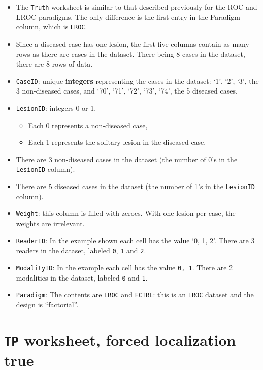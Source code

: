 \documentclass[
]{book}
\providecommand{\tightlist}{%
  \setlength{\itemsep}{0pt}\setlength{\parskip}{0pt}}
\begin{document}
\begin{itemize}
\tightlist
\item
  The \texttt{Truth} worksheet is similar to that described previously for the ROC and LROC paradigms. The only difference is the first entry in the Paradigm column, which is \texttt{LROC}.
\item
  Since a diseased case has one lesion, the first five columns contain as many rows as there are cases in the dataset. There being 8 cases in the dataset, there are 8 rows of data.
\item
  \texttt{CaseID}: unique \textbf{integers} representing the cases in the dataset: `1', `2', `3', the 3 non-diseased cases, and `70', `71', `72', `73', `74', the 5 diseased cases.\\
\item
  \texttt{LesionID}: integers 0 or 1.

  \begin{itemize}
  \tightlist
  \item
    Each 0 represents a non-diseased case,
  \item
    Each 1 represents the solitary lesion in the diseased case.
  \end{itemize}
\item
  There are 3 non-diseased cases in the dataset (the number of 0's in the \texttt{LesionID} column).
\item
  There are 5 diseased cases in the dataset (the number of 1's in the \texttt{LesionID} column).
\item
  \texttt{Weight}: this column is filled with zeroes. With one lesion per case, the weights are irrelevant.
\item
  \texttt{ReaderID}: In the example shown each cell has the value `0, 1, 2'. There are 3 readers in the dataset, labeled \texttt{0}, \texttt{1} and \texttt{2}.
\item
  \texttt{ModalityID}: In the example each cell has the value \texttt{0,\ 1}. There are 2 modalities in the dataset, labeled \texttt{0} and \texttt{1}.
\item
  \texttt{Paradigm}: The contents are \texttt{LROC} and \texttt{FCTRL}: this is an \texttt{LROC} dataset and the design is ``factorial''.
\end{itemize}

\hypertarget{quick-start-lroc-tp1}{%
\section{\texorpdfstring{\texttt{TP} worksheet, forced localization true}{TP worksheet, forced localization true}}\label{quick-start-lroc-tp1}}
\end{document}
